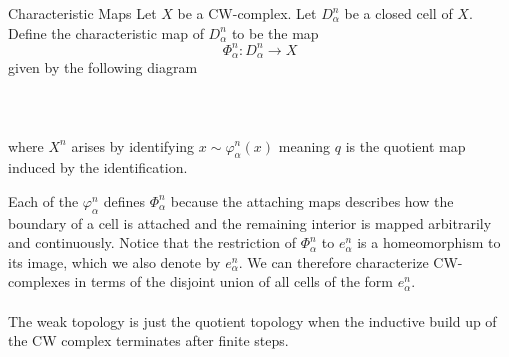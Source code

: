 \documentclass[a4paper]{article}
\begin{document}
\begin{defn}{Characteristic Maps}{} Let $X$ be a CW-complex. Let $D_\alpha^n$ be a closed cell of $X$. Define the characteristic map of $D_\alpha^n$ to be the map $$\Phi_\alpha^n:D_\alpha^n\to X$$ given by the following diagram \\~\\
\\~\\
where $X^n$ arises by identifying $x\sim\varphi_\alpha^n(x)$ meaning $q$ is the quotient map induced by the identification. 
\end{defn}

Each of the $\varphi_\alpha^n$ defines $\Phi_\alpha^n$ because the attaching maps describes how the boundary of a cell is attached and the remaining interior is mapped arbitrarily and continuously. Notice that the restriction of $\Phi_\alpha^n$ to $e_\alpha^n$ is a homeomorphism to its image, which we also denote by $e_\alpha^n$. We can therefore characterize CW-complexes in terms of the disjoint union of all cells of the form $e_\alpha^n$. \\~\\

The weak topology is just the quotient topology when the inductive build up of the CW complex terminates after finite steps. 
\end{document}
